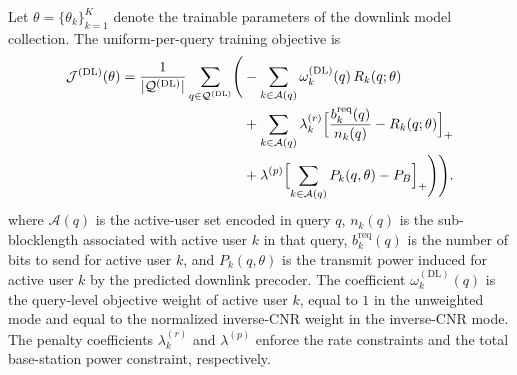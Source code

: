 \documentclass[11pt]{article}
\newcommand{\Aset}{\mathcal{A}}
\newcommand{\Qset}{\mathcal{Q}}
\newcommand{\DL}{\mathrm{DL}}
\begin{document}
Let $\theta=\{\theta_k\}_{k=1}^K$ denote the trainable parameters of the
downlink model collection. The uniform-per-query training objective is
\begin{equation}
\begin{aligned}
\mathcal{J}^{(\DL)}(\theta)
=
\frac{1}{\lvert\Qset^{(\DL)}\rvert}
\sum_{q\in\Qset^{(\DL)}}
\Biggl(
&-\sum_{k\in\Aset(q)} \omega_k^{(\DL)}(q)\,R_k(q;\theta)\\
&+ \sum_{k\in\Aset(q)}
\lambda_k^{(r)}
\Bigl[\frac{b_k^{\mathrm{req}}(q)}{n_k(q)}-R_k(q;\theta)\Bigr]_+\\
&+ \lambda^{(p)}
\Bigl[
\sum_{k\in\Aset(q)}P_k(q,\theta)-P_B
\Bigr]_+
\Biggr)
\Biggr).
\end{aligned}
\label{eq:dl-training-objective}
\end{equation}
where $\Aset(q)$ is the active-user set encoded in query $q$, $n_k(q)$ is the
sub-blocklength associated with active user $k$ in that query,
$b_k^{\mathrm{req}}(q)$ is the number of bits to send for active user $k$, and
$P_k(q,\theta)$ is the transmit power induced for active user $k$ by the
predicted downlink precoder. The coefficient $\omega_k^{(\DL)}(q)$ is the
query-level objective weight of active user $k$, equal to $1$ in the unweighted
mode and equal to the normalized inverse-CNR weight in the
inverse-CNR mode. The penalty coefficients $\lambda_k^{(r)}$ and
$\lambda^{(p)}$ enforce the rate constraints and the total base-station power
constraint, respectively.
\end{document}
